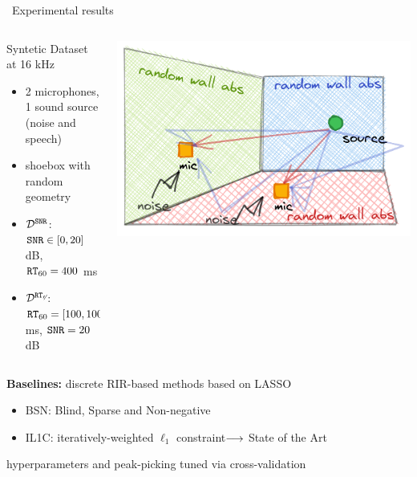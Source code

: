 \begin{frame}{\faFlask~Experimental results \hfill\faJediOrder}

    \begin{columns}[onlytextwidth]
        \begin{column}{0.60\textwidth}
            \begin{block}{Syntetic Dataset at 16 kHz}
                \small
                \begin{itemize}
                    \item 2 microphones, 1 sound source (noise and speech)
                    \item shoebox with random geometry
                    \item $\mathcal{D^{\mathtt{SNR}}}$: $\mathtt{SNR} \in [0, 20]$ dB, $\mathtt{RT}_{60} = 400$ ms
                    \item $\mathcal{D^{\mathtt{RT}_{60}}}$: $\mathtt{RT}_{60} = [100, 1000]$ ms, $\mathtt{SNR} = 20$ dB
                \end{itemize}
            \end{block}
        \end{column}

        \begin{column}{0.40\textwidth}
        \includegraphics[width=\textwidth]{figures/aer_scenario.png}
        \end{column}
    \end{columns}

    \vfill
    \begin{mysotablock}

        \textbf{Baselines:} discrete RIR-based methods based on LASSO
        \begin{itemize}
            \item BSN: Blind, Sparse and Non-negative\footnotemark[1]
            \item IL1C: iteratively-weighted $\ell_1$ constraint\footnotemark[2] $\longrightarrow$ State of the Art
        \end{itemize}
        {\footnotesize \hfill hyperparameters and peak-picking tuned via cross-validation}
    \end{mysotablock}


\end{frame}
